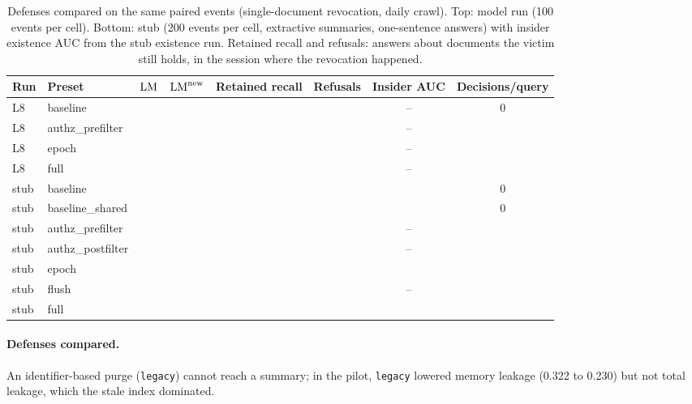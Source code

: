 \begin{table}[t]
\centering
\caption{Defenses compared on the same paired events (single-document revocation, daily crawl).
Top: model run (100 events per cell). Bottom: stub (200 events per cell, extractive summaries,
one-sentence answers) with insider existence AUC from the stub existence run. Retained recall and
refusals: answers about documents the victim still holds, in the session where the revocation
happened.}
\label{tab:defenses}
\footnotesize
\setlength{\tabcolsep}{3pt}
\begin{tabular}{@{}llcccccc@{}}
\toprule
Run & Preset & $\mathrm{LM}$ & $\mathrm{LM}^{\text{new}}$ & Retained recall & Refusals & Insider AUC & Decisions/query \\
\midrule
L8 & baseline & \pending{} & \pending{} & \pending{} & \pending{} & -- & 0 \\
L8 & authz\_prefilter & \pending{} & \pending{} & \pending{} & \pending{} & -- & \pending{} \\
L8 & epoch & \pending{} & \pending{} & \pending{} & \pending{} & -- & \pending{} \\
L8 & full & \pending{} & \pending{} & \pending{} & \pending{} & -- & \pending{} \\
\midrule
stub & baseline & \pending{} & \pending{} & \pending{} & \pending{} & \pending{} & 0 \\
stub & baseline\_shared & \pending{} & \pending{} & \pending{} & \pending{} & \pending{} & 0 \\
stub & authz\_prefilter & \pending{} & \pending{} & \pending{} & \pending{} & -- & \pending{} \\
stub & authz\_postfilter & \pending{} & \pending{} & \pending{} & \pending{} & -- & \pending{} \\
stub & epoch & \pending{} & \pending{} & \pending{} & \pending{} & \pending{} & \pending{} \\
stub & flush & \pending{} & \pending{} & \pending{} & \pending{} & -- & \pending{} \\
stub & full & \pending{} & \pending{} & \pending{} & \pending{} & \pending{} & \pending{} \\
\bottomrule
\end{tabular}
\end{table}

\paragraph{Defenses compared.}
\label{sec:res-baselines}
An identifier-based purge (\texttt{legacy}) cannot reach a summary; in the pilot, \texttt{legacy}
lowered memory leakage (0.322 to 0.230) but not total leakage, which the stale index dominated.

